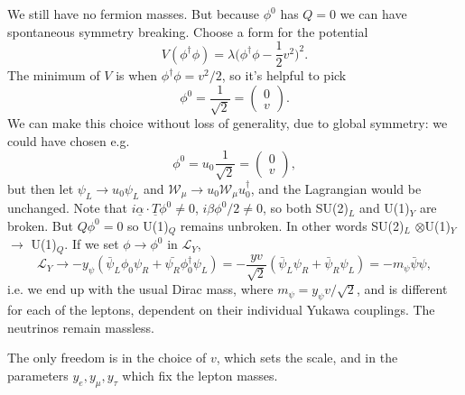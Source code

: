 \documentclass[a4paper,12pt]{article}
\begin{document}
We still have no fermion masses. But because $\phi^0$ has $Q=0$ we can have spontaneous symmetry breaking. Choose a form for the potential
\begin{equation}
V(\phi^\dagger \phi) = \lambda \bigg(\phi^\dagger \phi - \frac{1}{2}v^2\bigg)^2.
\end{equation}
The minimum of $V$ is when $\phi^\dagger \phi = v^2/2$, so it's helpful to pick 
\[\phi^0 = \frac{1}{\sqrt{2}} = \left( \begin{array}{cc}
0   \\
v   \end{array} \right). \]
We can make this choice without loss of generality, due to global symmetry: we could have chosen e.g.
\[\phi^0 = u_0\frac{1}{\sqrt{2}} = \left( \begin{array}{cc}
0   \\
v   \end{array} \right), \]
but then let $\psi_L \to u_0 \psi_L$ and $\mathcal{W}_\mu \to u_0 \mathcal{W}_\mu u_0^\dagger$, and the Lagrangian would be unchanged.
Note that $i \underline{\alpha}\cdot \underline{T} \phi^0 \neq 0$, $i\beta\phi^0/2 \neq 0$, so both SU(2)$_L$ and U(1)$_Y$ are broken. But $Q\phi^0 = 0$ so U(1)$_Q$ remains unbroken. In other words SU(2)$_L$ $\otimes$U(1)$_Y$ $\to$ U(1)$_Q$. If we set $\phi \to \phi^0$ in $\mathcal{L}_Y$,
\begin{equation}
\mathcal{L}_Y \to -y_\psi (\bar{\psi}_L \phi_0 \psi_R + \bar{\psi_R} \phi_0^\dagger \psi_L) = -\frac{yv}{\sqrt{2}}(\bar{\psi}_L \psi_R + \bar{\psi}_R \psi_L) = -m_\psi \bar{\psi} \psi,
\end{equation}
i.e. we end up with the usual Dirac mass, where $m_\psi = y_\psi v/\sqrt{2}$, and is different for each of the leptons, dependent on their individual Yukawa couplings. The neutrinos remain massless. 

The only freedom is in the choice of $v$, which sets the scale, and in the parameters $y_e, y_\mu, y_\tau$ which fix the lepton masses.
\end{document}
